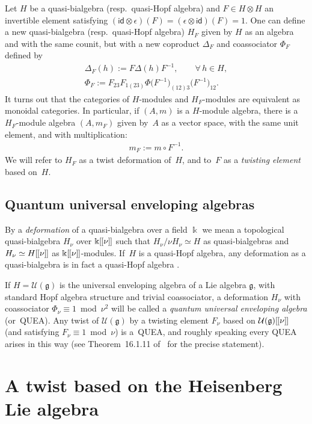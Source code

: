 \documentclass[pdftex]{sigma}
\numberwithin{equation}{section}
\theoremstyle{definition}
\newcommand{\U}{\mathcal{U}}
\newcommand{\id}{\mathsf{id}}
\newcommand{\mf}{\mathfrak}
\newcommand{\lbrak}{[\hspace{-0.5pt}[}
\newcommand{\rbrak}{]\hspace{-0.5pt}]}
\renewcommand{\hbar}{\nu}
\begin{document}
Let $H$ be a quasi-bialgebra (resp.~quasi-Hopf algebra) and $F\in H\otimes H$ an invertible element satisfying $(\id\otimes\epsilon)(F)=(\epsilon\otimes\id)(F)=1$. One can def\/ine a new quasi-bialgebra (resp.~quasi-Hopf algebra) $H_F$ given by $H$ as an algebra and with the same counit, but with a new coproduct $\Delta_F$ and coassociator $\Phi_F$ def\/ined by
\begin{gather*}
 \Delta_F(h) :=F\Delta(h)F^{-1},\qquad \forall\, h\in H,\\
 \Phi_F :=F_{23}F_{1(23)} \Phi
\big(F^{-1}\big)_{(12)3}\big(F^{-1}\big)_{12} .
\end{gather*}
It turns out that the categories of $H$-modules and $H_F$-modules are equivalent as monoidal categories.
In particular, if $(A,m)$ is a $H$-module algebra, there is a $H_F$-module algebra $(A,m_F)$ given by~$A$ as a vector space, with the same unit element, and with multiplication:
\begin{gather}\label{eq:mf}
m_F:=m\circ F^{-1} .
\end{gather}
We will refer to $H_F$ as a twist deformation of~$H$, and to~$F$ as a \emph{twisting element} based on~$H$.

\subsection{Quantum universal enveloping algebras}\label{sec:QUEA}

By a \emph{deformation} of a quasi-bialgebra over a f\/ield $\Bbbk$ we mean a topological quasi-bialgebra $H_\hbar$ over $\Bbbk\lbrak\hbar\rbrak$
such that $H_\hbar/\hbar H_\hbar\simeq H$ as quasi-bialgebras and $H_\hbar\simeq H\lbrak\hbar\rbrak$ as $\Bbbk\lbrak\hbar\rbrak$-modules.
If~$H$ is a quasi-Hopf algebra, any deformation as a quasi-bialgebra is in fact a quasi-Hopf algebra \cite[Section~16.1C]{CP94}.

If $H=\U(\mf{g})$ is the universal enveloping algebra of a Lie algebra $\mf{g}$, with standard Hopf algebra structure and trivial coassociator, a deformation $H_\hbar$ with coassociator \mbox{$\Phi_\hbar\equiv 1$ mod $\hbar^2$} will be called a \emph{quantum universal enveloping algebra} (or~QUEA). Any twist of $\U(\mf{g})$ by a twisting element $F_\hbar$ based on $\U(\mf{g})\lbrak\hbar\rbrak$
(and satisfying \mbox{$F_\hbar\equiv 1$ mod $\hbar$}) is a~QUEA, and roughly speaking every QUEA arises in this way (see Theorem~16.1.11 of~\cite{CP94} for the precise statement).

\section{A twist based on the Heisenberg Lie algebra}\label{sec:3}
\end{document}
